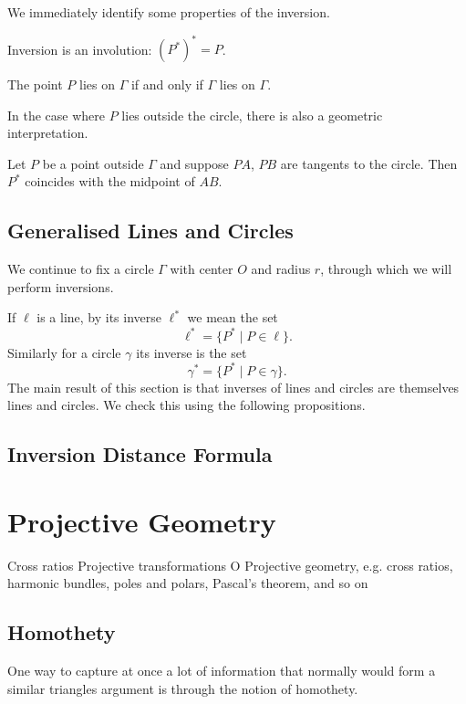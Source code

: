 We immediately identify some properties of the inversion.

\begin{proposition}
Inversion is an involution: $(P^*)^*=P$.
\end{proposition}

\begin{proposition}
The point $P$ lies on $\Gamma$ if and only if $\Gamma$ lies on $\Gamma$.
\end{proposition}

In the case where $P$ lies outside the circle, there is also a geometric interpretation.

\begin{theorem}
Let $P$ be a point outside $\Gamma$ and suppose $PA$, $PB$ are tangents to the circle. Then $P^*$ coincides with the midpoint of $AB$.
\end{theorem}

\subsection{Generalised Lines and Circles}
We continue to fix a circle $\Gamma$ with center $O$ and radius $r$, through which we will perform inversions.

If $\ell$ is a line, by its inverse $\ell^*$ we mean the set
\[ \ell^*=\{P^*\mid P\in\ell\}. \]
Similarly for a circle $\gamma$ its inverse is the set
\[ \gamma^*=\{P^*\mid P\in\gamma\}. \]
The main result of this section is that inverses of lines and circles are themselves lines and circles. We check this using the following propositions.



\subsection{Inversion Distance Formula}

\pagebreak

\section{Projective Geometry}
Cross ratios
Projective transformations
O Projective geometry, e.g. cross ratios, harmonic bundles, poles and polars,
Pascal's theorem, and so on

\subsection{Homothety}
One way to capture at once a lot of information that normally would form a similar triangles argument is through the notion of homothety.

